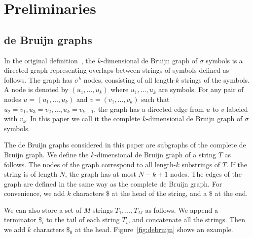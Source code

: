 \documentclass{llncs}
\begin{document}

\section{Preliminaries}\label{sec:preliminaries}

\subsection{de Bruijn graphs}
In the original definition~\cite{deBruijn46}, the $k$-dimensional de Bruijn graph of $\sigma$ symbols
is a directed graph representing overlaps between strings of symbols defined as follows.
The graph has $\sigma^k$ nodes, consisting of all length-$k$ strings of the symbols.
A node is denoted by $(u_1,\ldots,u_k)$ where $u_1,\ldots,u_k$ are symbols.
For any pair of nodes $u = (u_1,\ldots,u_k)$ and $v = (v_1,\ldots,v_k)$ 
such that 
$u_2 = v_1, u_3 = v_2, \ldots, u_k = v_{k-1}$, the graph has a directed
edge from $u$ to $v$ labeled with $v_k$.
In this paper we call it the complete $k$-dimensional de Bruijn graph
of $\sigma$ symbols.

The de Bruijn graphs considered in this paper are subgraphs of the complete de Bruijn graph.
We define the $k$-dimensional de Bruijn graph of a string $T$ as follows.
The nodes of the graph correspond to all length-$k$ substrings of $T$.  If the string is of length $N$,
the graph has at most $N-k+1$ nodes.  The edges of the graph are defined in the same way as the complete
de Bruijn graph.  For convenience, we add $k$ characters \$ at the head of the string,
and a \$ at the end.

We can also store a set of $M$ strings $T_1,\ldots,T_M$ as follows.
We append a terminator $\$_i$ to the tail of each string $T_i$,
and concatenate all the strings.  Then we add $k$ characters $\$_0$ at the head.
Figure~\ref{fig:debruijn} shows an example.


\end{document}
